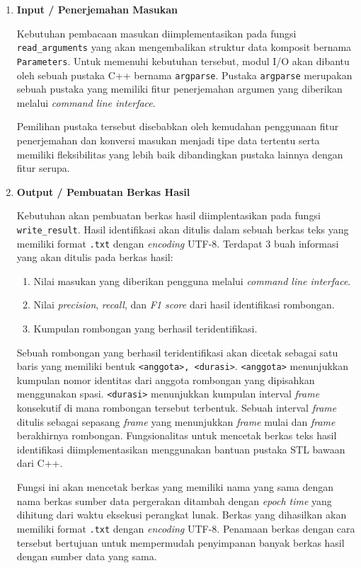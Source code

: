 \begin{enumerate}
    \item \textbf{Input / Penerjemahan Masukan}
    
    Kebutuhan pembacaan masukan diimplementasikan pada fungsi \texttt{read\_arguments} yang akan mengembalikan struktur data komposit bernama \texttt{Parameters}. Untuk memenuhi kebutuhan tersebut, modul I/O akan dibantu oleh sebuah pustaka C++ bernama \texttt{argparse}. Pustaka \texttt{argparse} merupakan sebuah pustaka yang memiliki fitur penerjemahan argumen yang diberikan melalui \textit{command line interface}.
    
    Pemilihan pustaka tersebut disebabkan oleh kemudahan penggunaan fitur penerjemahan dan konversi masukan menjadi tipe data tertentu serta memiliki fleksibilitas yang lebih baik dibandingkan pustaka lainnya dengan fitur serupa. 
    
    \item \textbf{Output / Pembuatan Berkas Hasil}
    
    Kebutuhan akan pembuatan berkas hasil diimplentasikan pada fungsi \texttt{write\_result}. Hasil identifikasi akan ditulis dalam sebuah berkas teks yang memiliki format \texttt{.txt} dengan \textit{encoding} UTF-8. Terdapat 3 buah informasi yang akan ditulis pada berkas hasil:
    
    \begin{enumerate}
        \item Nilai masukan yang diberikan pengguna melalui \textit{command line interface}.
        
        \item Nilai \textit{precision}, \textit{recall}, dan \textit{F1 score} dari hasil identifikasi rombongan.
        
        \item Kumpulan rombongan yang berhasil teridentifikasi.
    \end{enumerate}
    
    Sebuah rombongan yang berhasil teridentifikasi akan dicetak sebagai satu baris yang memiliki bentuk \texttt{<anggota>, <durasi>}. \texttt{<anggota>} menunjukkan kumpulan nomor identitas dari anggota rombongan yang dipisahkan menggunakan spasi. \texttt{<durasi>} menunjukkan kumpulan interval \textit{frame} konsekutif di mana rombongan tersebut terbentuk. Sebuah interval \textit{frame} ditulis sebagai sepasang \textit{frame} yang menunjukkan \textit{frame} mulai dan \textit{frame} berakhirnya rombongan. Fungsionalitas untuk mencetak berkas teks hasil identifikasi diimplementasikan menggunakan bantuan pustaka STL bawaan dari C++.
    
    Fungsi ini akan mencetak berkas yang memiliki nama yang sama dengan nama berkas sumber data pergerakan ditambah dengan \textit{epoch time} yang dihitung dari waktu eksekusi perangkat lunak. Berkas yang dihasilkan akan memiliki format \texttt{.txt} dengan \textit{encoding} UTF-8. Penamaan berkas dengan cara tersebut bertujuan untuk mempermudah penyimpanan banyak berkas hasil dengan sumber data yang sama. 
\end{enumerate}

